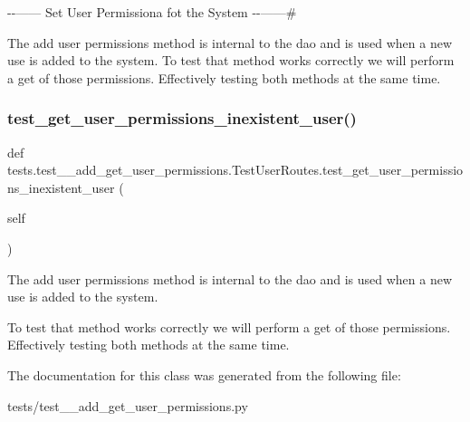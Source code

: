 -\/-\/------ Set User Permissiona fot the System -\/-\/------\# 

The add user permissions method is internal to the dao and is used when a new use is added to the system. To test that method works correctly we will perform a get of those permissions. Effectively testing both methods at the same time. \mbox{\label{classtests_1_1test__9__add__get__user__permissions_1_1_test_user_routes_a5f2561c9f8eff8a8fcc6363a633f1ef2}} 
\subsubsection{\texorpdfstring{test\+\_\+get\+\_\+user\+\_\+permissions\+\_\+inexistent\+\_\+user()}{test\_get\_user\_permissions\_inexistent\_user()}}
{\footnotesize\ttfamily def tests.\+test\+\_\+\_\+add\+\_\+get\+\_\+user\+\_\+permissions.\+Test\+User\+Routes.\+test\+\_\+get\+\_\+user\+\_\+permissions\+\_\+inexistent\+\_\+user (\begin{DoxyParamCaption}\item[{}]{self }\end{DoxyParamCaption})}



The add user permissions method is internal to the dao and is used when a new use is added to the system. 

To test that method works correctly we will perform a get of those permissions. Effectively testing both methods at the same time. 

The documentation for this class was generated from the following file\+:\begin{DoxyCompactItemize}
\item 
tests/test\+\_\+\_\+add\+\_\+get\+\_\+user\+\_\+permissions.\+py\end{DoxyCompactItemize}
